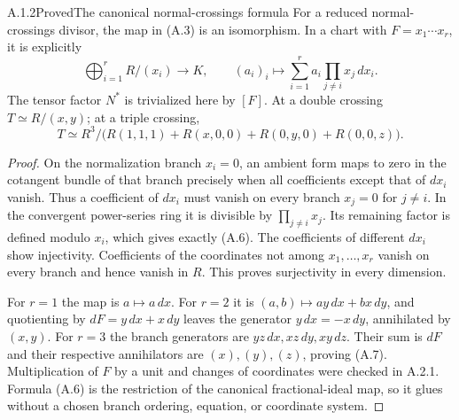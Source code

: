 \begin{statement}{A.1.2}{Proved}{The canonical normal-crossings formula}
For a reduced normal-crossings divisor, the map in (A.3) is an isomorphism. In a chart with $F=x_1\cdots x_r$, it is explicitly
\[
 \bigoplus_{i=1}^r R/(x_i)\longrightarrow K,
 \qquad (a_i)_i\longmapsto
 \sum_{i=1}^r a_i\prod_{j\ne i}x_j\,dx_i.
\tag{A.6}
\]
The tensor factor $N^*$ is trivialized here by $[F]$. At a double crossing $T\simeq R/(x,y)$; at a triple crossing,
\[
 T\simeq R^3/\bigl(R(1,1,1)+R(x,0,0)+R(0,y,0)+R(0,0,z)\bigr).
\tag{A.7}
\]
\end{statement}
\begin{proof}
On the normalization branch $x_i=0$, an ambient form maps to zero in the cotangent bundle of that branch precisely when all coefficients except that of $dx_i$ vanish. Thus a coefficient of $dx_i$ must vanish on every branch $x_j=0$ for $j\ne i$. In the convergent power-series ring it is divisible by $\prod_{j\ne i}x_j$. Its remaining factor is defined modulo $x_i$, which gives exactly (A.6). The coefficients of different $dx_i$ show injectivity. Coefficients of the coordinates not among $x_1,\ldots,x_r$ vanish on every branch and hence vanish in $R$. This proves surjectivity in every dimension.

For $r=1$ the map is $a\mapsto a\,dx$. For $r=2$ it is $(a,b)\mapsto ay\,dx+bx\,dy$, and quotienting by $dF=y\,dx+x\,dy$ leaves the generator $y\,dx=-x\,dy$, annihilated by $(x,y)$. For $r=3$ the branch generators are $yz\,dx,xz\,dy,xy\,dz$. Their sum is $dF$ and their respective annihilators are $(x),(y),(z)$, proving (A.7). Multiplication of $F$ by a unit and changes of coordinates were checked in A.2.1. Formula (A.6) is the restriction of the canonical fractional-ideal map, so it glues without a chosen branch ordering, equation, or coordinate system.
\end{proof}

